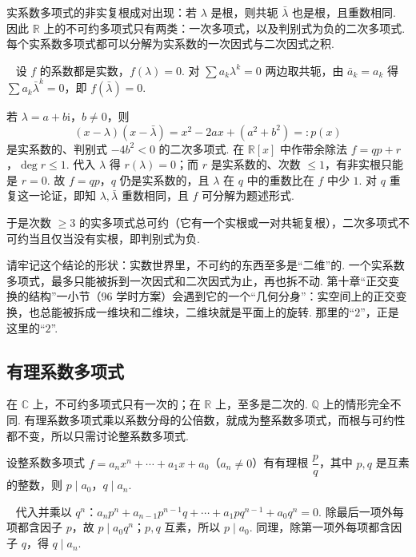\documentclass[lang=cn,10.5pt,scheme=chinese,toc=twocol,section,chinesefont=nofont,
twoside,citestyle=gb7714-2015,bibstyle=gb7714-2015]{elegantbook}
\DeclareRobustCommand{\textbf}[1]{{\lnsemiboldlatin\lnsemiboldcjk #1}}
\numberwithin{equation}{section}   %
\newcommand{\hC}{\texorpdfstring{\textdaggerdbl}{‡}}
\newcommand*{\lnlabel}[1]{{\sffamily\bfseries\color{black}#1}}
\renewenvironment{proof}{%
	\par\noindent\lnlabel{\proofname}\;\ \color{black!90}\cfs}{\par}
\begin{document}
\begin{theorem}
  \label{thm:realfactor}
  实系数多项式的非实复根成对出现：若 $\lambda$ 是根，则共轭 $\bar\lambda$ 也是根，且重数相同. 因此 $\mathbb{R}$ 上的不可约多项式只有两类：一次多项式，以及判别式为负的二次多项式. 每个实系数多项式都可以分解为实系数的一次因式与二次因式之积.
\end{theorem}
\begin{proof}
  设 $f$ 的系数都是实数，$f(\lambda)=0$. 对 $\sum a_k\lambda^k=0$ 两边取共轭，由 $\bar a_k=a_k$ 得 $\sum a_k\bar\lambda^k=0$，即 $f(\bar\lambda)=0$.

  若 $\lambda=a+b\mathrm i$，$b\ne0$，则
  \[(x-\lambda)(x-\bar\lambda)=x^2-2ax+(a^2+b^2)=:p(x)\]
  是实系数的、判别式 $-4b^2<0$ 的二次多项式. 在 $\mathbb{R}[x]$ 中作带余除法 $f=qp+r$，$\deg r\le1$. 代入 $\lambda$ 得 $r(\lambda)=0$；而 $r$ 是实系数的、次数 $\le1$，有非实根只能是 $r=0$. 故 $f=qp$，$q$ 仍是实系数的，且 $\lambda$ 在 $q$ 中的重数比在 $f$ 中少 $1$. 对 $q$ 重复这一论证，即知 $\lambda,\bar\lambda$ 重数相同，且 $f$ 可分解为题述形式.

  于是次数 $\ge3$ 的实多项式总可约（它有一个实根或一对共轭复根），二次多项式不可约当且仅当没有实根，即判别式为负.
\end{proof}

\begin{motivebox}
  请牢记这个结论的形状：\textbf{实数世界里，不可约的东西至多是“二维”的.} 一个实系数多项式，最多只能被拆到一次因式和二次因式为止，再也拆不动. 第十章“正交变换的结构”一小节（96 学时方案）会遇到它的一个“几何分身”：实空间上的正交变换，也总能被拆成一维块和二维块，二维块就是平面上的旋转. 那里的“$2$”，正是这里的“$2$”.
\end{motivebox}

\subsection{\hC 有理系数多项式}

在 $\mathbb{C}$ 上，不可约多项式只有一次的；在 $\mathbb{R}$ 上，至多是二次的. $\mathbb{Q}$ 上的情形完全不同. 有理系数多项式乘以系数分母的公倍数，就成为整系数多项式，而根与可约性都不变，所以只需讨论整系数多项式.

\begin{proposition}
  \label{prop:ratroot}
  设整系数多项式 $f=a_nx^n+\cdots+a_1x+a_0$（$a_n\ne0$）有有理根 $\dfrac pq$，其中 $p,q$ 是互素的整数，则 $p\mid a_0$，$q\mid a_n$.
\end{proposition}
\begin{proof}
  代入并乘以 $q^n$：$a_np^n+a_{n-1}p^{n-1}q+\cdots+a_1pq^{n-1}+a_0q^n=0$. 除最后一项外每项都含因子 $p$，故 $p\mid a_0q^n$；$p,q$ 互素，所以 $p\mid a_0$. 同理，除第一项外每项都含因子 $q$，得 $q\mid a_n$.
\end{proof}
\end{document}
